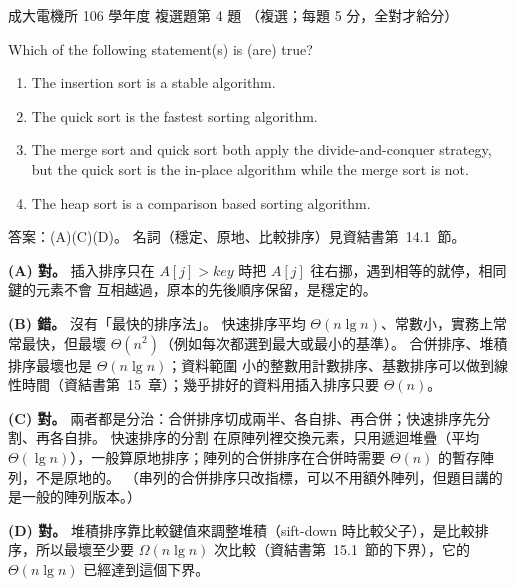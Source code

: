 \begin{pastexam}[label={px:ncku-106-ee-ds-04}]{成大電機所 106 學年度 複選題第 4 題}
（複選；每題 5 分，全對才給分）

Which of the following statement(s) is (are) true?
\begin{enumerate}[label=(\Alph*)]
\item The insertion sort is a stable algorithm.
\item The quick sort is the fastest sorting algorithm.
\item The merge sort and quick sort both apply the divide-and-conquer strategy, but the quick sort is the
in-place algorithm while the merge sort is not.
\item The heap sort is a comparison based sorting algorithm.
\end{enumerate}
\end{pastexam}

\begin{pastsoln}
答案：(A)(C)(D)。 名詞（穩定、原地、比較排序）見資結書第~14.1~節。

\textbf{(A) 對。} 插入排序只在 $A[j] > \mathit{key}$ 時把 $A[j]$ 往右挪，遇到相等的就停，相同鍵的元素不會
互相越過，原本的先後順序保留，是穩定的。

\textbf{(B) 錯。} 沒有「最快的排序法」。 快速排序平均 $\Theta(n \lg n)$、常數小，實務上常常最快，但最壞
$\Theta(n^2)$（例如每次都選到最大或最小的基準）。 合併排序、堆積排序最壞也是 $\Theta(n \lg n)$；資料範圍
小的整數用計數排序、基數排序可以做到線性時間（資結書第~15~章）；幾乎排好的資料用插入排序只要 $\Theta(n)$。

\textbf{(C) 對。} 兩者都是分治：合併排序切成兩半、各自排、再合併；快速排序先分割、再各自排。 快速排序的分割
在原陣列裡交換元素，只用遞迴堆疊（平均 $\Theta(\lg n)$），一般算原地排序；陣列的合併排序在合併時需要
$\Theta(n)$ 的暫存陣列，不是原地的。 （串列的合併排序只改指標，可以不用額外陣列，但題目講的是一般的陣列版本。）

\textbf{(D) 對。} 堆積排序靠比較鍵值來調整堆積（sift-down 時比較父子），是比較排序，所以最壞至少要
$\Omega(n \lg n)$ 次比較（資結書第~15.1~節的下界），它的 $\Theta(n \lg n)$ 已經達到這個下界。
\end{pastsoln}
